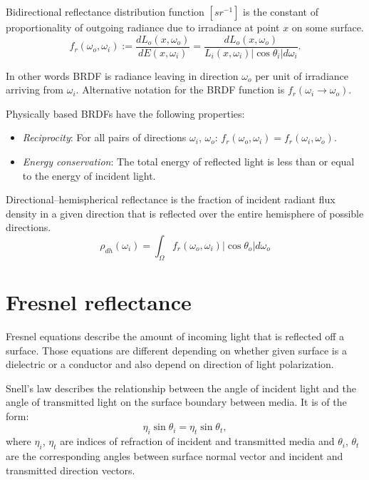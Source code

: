 \begin{df}[BRDF]
Bidirectional reflectance distribution function $[sr^{-1}]$ is the constant of proportionality of outgoing radiance due to irradiance at point $x$ on some surface.
\begin{equation}
  f_{r}(\omega_{o}, \omega_{i}) := \frac{dL_{o}(x, \omega_{o})}{dE(x, \omega_{i})} = \frac{dL_{o}(x, \omega_{o})}{L_{i}(x, \omega_{i}) |\cos\theta_{i}| d\omega_{i}}.
\end{equation}
\end{df}

In other words BRDF is radiance leaving in direction $\omega_{o}$ per unit of irradiance arriving from $\omega_{i}$. Alternative notation for the BRDF function is $f_{r}(\omega_{i} \rightarrow \omega_{o})$.

Physically based BRDFs have the following properties:
\begin{itemize}
\item \emph{Reciprocity}: For all pairs of directions $\omega_{i}$, $\omega_{o}$: $f_{r}(\omega_{o}, \omega_{i}) = f_{r}(\omega_{i}, \omega_{o})$.
\item \emph{Energy conservation}: The total energy of reflected light is less than or equal to the energy of incident light.
\end{itemize}

\begin{df}
Directional--hemispherical reflectance \parencite{sillion94} is the fraction of incident radiant flux density in a given direction that is reflected over the entire hemisphere of possible directions.
\begin{equation}
\label{eq:dhrefl}
  \rho_{dh}(\omega_{i}) = \int_{\Omega} f_{r}(\omega_{o}, \omega_{i}) |\cos\theta_{o}| d\omega_{o}
\end{equation}
\end{df}

\section{Fresnel reflectance}
Fresnel equations describe the amount of incoming light that is reflected off a surface. Those equations are different depending on whether given surface is a dielectric or a conductor and also depend on direction of light polarization.

\begin{df}
Snell's law describes the relationship between the angle of incident light and the angle of transmitted light on the surface boundary between media. It is of the form:
\begin{equation}
  \eta_{i} \sin\theta_{i} = \eta_{t} \sin\theta_{t},
\end{equation}
where $\eta_{i}$, $\eta_{t}$ are indices of refraction of incident and transmitted media and $\theta_{i}$, $\theta_{t}$ are the corresponding angles between surface normal vector and incident and transmitted direction vectors.
\end{df}

